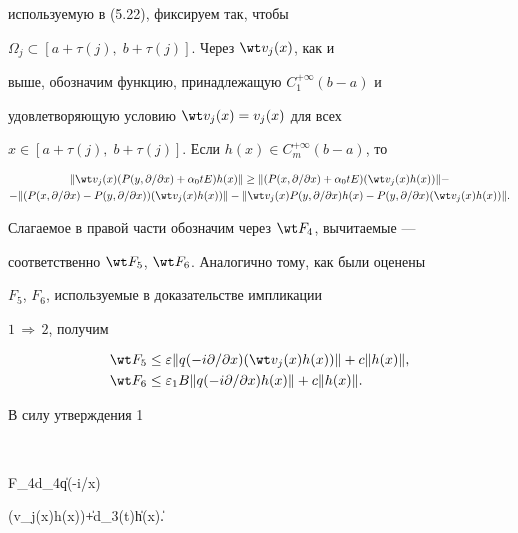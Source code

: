 используемую в (5.22), фиксируем так, чтобы 


$\Omega_j\subset[a+\tau(j),\;b+\tau(j)]$. Через $\wt v_j(x)$, как и 


выше, обозначим функцию, принадлежащую $C^{+\infty}_1(b-a)$ и 


удовлетворяющую условию $\wt v_j(x)=v_j(x)$ для всех 


$x\in[a+\tau(j),\;b+\tau(j)]$. Если $h(x)\in C^{+\infty}_m(b-a)$, то 


\begin{multline*} 


\|\wt v_j(x)(P(y,\partial/\partial x)+\alpha_0t E)h(x)\|\ge 


\|(P(x,\partial/\partial x)+\alpha_0t E) 


(\wt v_j(x)h(x))\|- \\ 


% 


-\|(P(x,\partial/\partial x)-P(y,\partial/\partial x)) 


(\wt v_j(x)h(x))\|-\|\wt v_j(x) 


P(y,\partial/\partial x)h(x)-P(y,\partial/\partial x) 


(\wt v_j(x)h(x))\|. 


\end{multline*} 


Слагаемое в правой части обозначим через $\wt F_4$, вычитаемые --- 


соответственно $\wt F_5$, $\wt F_6$. Аналогично тому, как были оценены 


$F_5$, $F_6$, используемые в доказательстве импликации 


$1\,\Rightarrow\,2$, получим 


\begin{align*} 


\wt F_5&\le\varepsilon\|q(-i\partial/\partial x) 


(\wt v_j(x)h(x))\|+c\|h(x)\|, \\ 


% 


\wt F_6&\le\varepsilon_1B\|q(-i\partial/\partial x) 


h(x)\|+c\|h(x)\|. 


\end{align*} 


В силу утверждения 1 


$$ 


\wt F_4\ge d_4\|q(-i\partial/\partial x) 


(\wt v_j(x)h(x))\|+d_3(t)\|h(x)\|. 


